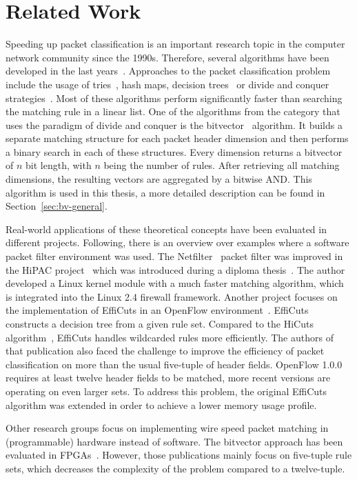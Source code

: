 \documentclass[conference]{IEEEtran}
\begin{document}
\section{Related Work}
Speeding up packet classification is an important research topic in the computer network community since the 1990s.
Therefore, several algorithms have been developed in the last years~\cite{algorithms_survey}.
Approaches to the packet classification problem include the usage of tries~\cite{tries}, 
hash maps, decision trees~\cite{hicuts, efficuts, hypercuts} or divide and conquer strategies~\cite{bv}.
Most of these algorithms perform significantly faster than searching the matching rule in a linear list.
One of the algorithms from the category that uses the paradigm of divide and conquer is the bitvector~\cite{bv} algorithm.
It builds a separate matching structure for each packet header dimension and 
then performs a binary search in each of these structures.
Every dimension returns a bitvector of $n$ bit length, with $n$ being the number of rules.
After retrieving all matching dimensions, the resulting vectors are aggregated by a bitwise AND.
This algorithm is used in this thesis, a more detailed description can be found in Section~\ref{sec:bv-general}.

Real-world applications of these theoretical concepts have been evaluated in different projects.
Following, there is an overview over examples where a software packet filter environment was used.
The Netfilter~\cite{netfilter} packet filter was improved in the HiPAC project~\cite{hipac} 
which was introduced during a diploma thesis~\cite{heinzhigh}.
The author developed a Linux kernel module with a much faster matching algorithm, 
which is integrated into the Linux 2.4 firewall framework.
Another project focuses on the implementation of EffiCuts in an OpenFlow environment~\cite{stimpfling2013optimal}.
EffiCuts~\cite{efficuts} constructs a decision tree from a given rule set.
Compared to the HiCuts algorithm~\cite{hicuts}, EffiCuts handles wildcarded rules more efficiently.
The authors of that publication also faced the challenge to improve the efficiency 
of packet classification on more than the usual five-tuple of header fields.
OpenFlow 1.0.0~\cite{openflow_spec10} requires at least twelve header fields to 
be matched, more recent versions are operating on even larger sets.
To address this problem, the original EffiCuts algorithm was extended in order to achieve a lower memory usage profile.

Other research groups focus on implementing wire speed packet matching in (programmable) hardware instead of software.
The bitvector approach has been evaluated in FPGAs~\cite{bitvector_fpga, qu2013fast}.
However, those publications mainly focus on five-tuple rule sets, which decreases 
the complexity of the problem compared to a twelve-tuple.
\end{document}
